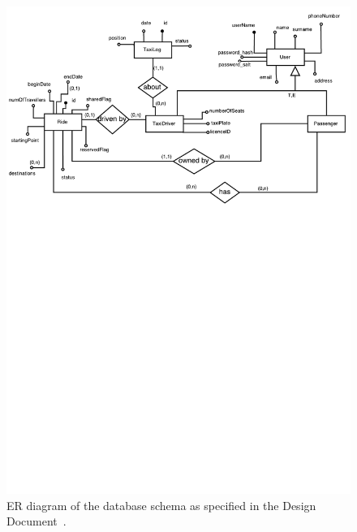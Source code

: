 \begin{figure}
    \centering
    \includegraphics[width=\textwidth]{../dd/diagrams/er_diagram.pdf}
    \caption{ER diagram of the database schema as specified in the Design Document~\cite{mytaxi-dd}.}
    \label{fig:er-diagram}
\end{figure}
